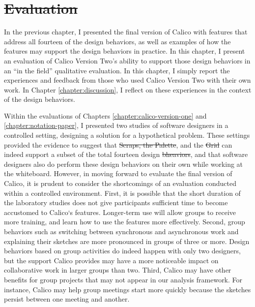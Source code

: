\documentclass[12pt,fleqn]{ucithesis}
\providecommand{\DIFaddtex}[1]{{\protect\color{blue}\uwave{#1}}} %
\providecommand{\DIFdeltex}[1]{{\protect\color{red}\sout{#1}}}                      %
\providecommand{\DIFaddbegin}{} %
\providecommand{\DIFaddend}{} %
\providecommand{\DIFdelbegin}{} %
\providecommand{\DIFdelend}{} %
\providecommand{\DIFadd}[1]{\texorpdfstring{\DIFaddtex{#1}}{#1}} %
\providecommand{\DIFdel}[1]{\texorpdfstring{\DIFdeltex{#1}}{}} %
\begin{document}
 \newpage 
 \newpage \chapter{\DIFdelbegin \DIFdel{Evaluation}\DIFdelend \DIFaddbegin \DIFadd{Study}\DIFaddend }
\label{chapter:evaluation}

In the previous chapter, I presented the final version of Calico with features that address all fourteen of the design behaviors, as well as examples of how the features may support the design behaviors in practice. In this chapter, I present an evaluation of Calico Version Two's ability to support those design behaviors in an ``in the field'' qualitative evaluation. In this chapter, I simply report the experiences and feedback from those who used Calico Version Two with their own work. In Chapter \ref{chapter:discussion}, I reflect on these experiences in the context of the design behaviors.

Within the evaluations of Chapters \ref{chapter:calico-version-one} and \ref{chapter:notation-paper}, I presented two studies of software designers in a controlled setting, designing a solution for a hypothetical problem. These settings provided the evidence to suggest that \DIFdelbegin \DIFdel{Scraps, the Palette}\DIFdelend \DIFaddbegin \DIFadd{scraps, the palette}\DIFaddend , and the \DIFdelbegin \DIFdel{Grid }\DIFdelend \DIFaddbegin \DIFadd{grid }\DIFaddend can indeed support a subset of the total fourteen design \DIFdelbegin \DIFdel{bheaviors}\DIFdelend \DIFaddbegin \DIFadd{behaviors}\DIFaddend , and that software designers also do perform these design behaviors on their own while working at the whiteboard. However, in moving forward to evaluate the final version of Calico, it is prudent to consider the shortcomings of an evaluation conducted within a controlled environment. First, it is possible that the short duration of the laboratory studies does not give participants sufficient time to become accustomed to Calico`s features. Longer-term use will allow groups to receive more training, and learn how to use the features more effectively. Second, group behaviors such as switching between synchronous and asynchronous work and explaining their sketches are more pronounced in groups of three or more. Design behaviors based on group activities do indeed happen with only two designers, but the support Calico provides may have a more noticeable impact on collaborative work in larger groups than two. Third, Calico may have other benefits for group projects that may not appear in our analysis framework. For instance, Calico may help group meetings start more quickly because the sketches persist between one meeting and another.
\end{document}
